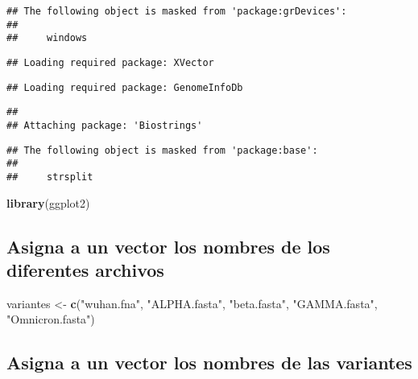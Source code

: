 \documentclass[
]{article}
\newenvironment{Shaded}{\begin{snugshade}}{\end{snugshade}}
\newcommand{\FunctionTok}[1]{\textcolor[rgb]{0.13,0.29,0.53}{\textbf{#1}}}
\newcommand{\NormalTok}[1]{#1}
\newcommand{\OtherTok}[1]{\textcolor[rgb]{0.56,0.35,0.01}{#1}}
\newcommand{\StringTok}[1]{\textcolor[rgb]{0.31,0.60,0.02}{#1}}
\begin{document}
\begin{verbatim}
## The following object is masked from 'package:grDevices':
## 
##     windows
\end{verbatim}

\begin{verbatim}
## Loading required package: XVector
\end{verbatim}

\begin{verbatim}
## Loading required package: GenomeInfoDb
\end{verbatim}

\begin{verbatim}
## 
## Attaching package: 'Biostrings'
\end{verbatim}

\begin{verbatim}
## The following object is masked from 'package:base':
## 
##     strsplit
\end{verbatim}

\begin{Shaded}
\begin{Highlighting}[]
\FunctionTok{library}\NormalTok{(ggplot2)}
\end{Highlighting}
\end{Shaded}

\hypertarget{asigna-a-un-vector-los-nombres-de-los-diferentes-archivos}{%
\subsection{Asigna a un vector los nombres de los diferentes
archivos}\label{asigna-a-un-vector-los-nombres-de-los-diferentes-archivos}}

\begin{Shaded}
\begin{Highlighting}[]
\NormalTok{variantes }\OtherTok{\textless{}{-}} \FunctionTok{c}\NormalTok{(}\StringTok{"wuhan.fna"}\NormalTok{, }\StringTok{"ALPHA.fasta"}\NormalTok{, }\StringTok{"beta.fasta"}\NormalTok{, }\StringTok{"GAMMA.fasta"}\NormalTok{, }\StringTok{"Omnicron.fasta"}\NormalTok{)}
\end{Highlighting}
\end{Shaded}

\hypertarget{asigna-a-un-vector-los-nombres-de-las-variantes}{%
\subsection{Asigna a un vector los nombres de las
variantes}\label{asigna-a-un-vector-los-nombres-de-las-variantes}}
\end{document}
